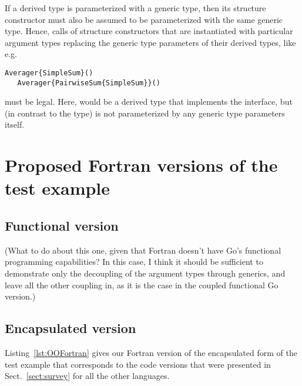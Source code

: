 \documentclass[11pt,oneside]{article}
\newcommand{\code}[1]{{\selectfont\ttfamily{#1}}}
\begin{document}
If a derived type is parameterized with a generic type, then its
structure constructor must also be assumed to be parameterized with
the same generic type. Hence, calls of structure constructors that are
instantiated with particular argument types replacing the generic type
parameters of their derived types, like e.g.
\begin{lstlisting}[language=LFortran,style=boxed]
   Averager{SimpleSum}()
   Averager{PairwiseSum{SimpleSum}}()
\end{lstlisting}
must be legal. Here, \code{SimpleSum} would be a derived type that
implements the \code{ISum} interface, but (in contrast to the
\code{PairwiseSum} type) is not parameterized by any generic type
parameters itself.

\newpage

\section{Proposed Fortran versions of the test example}

\subsection{Functional version}

{\sf (What to do about this one, given that Fortran doesn't have Go's
  functional programming capabilities? In this case, I think it should
  be sufficient to demonstrate only the decoupling of the argument
  types through generics, and leave all the other coupling in, as
  it is the case in the coupled functional Go version.)}

\subsection{Encapsulated version}

Listing~\ref{lst:OOFortran} gives our Fortran version of the
encapsulated form of the test example that corresponds to the code
versions that were presented in Sect.~\ref{sect:survey} for all the
other languages.
\end{document}

